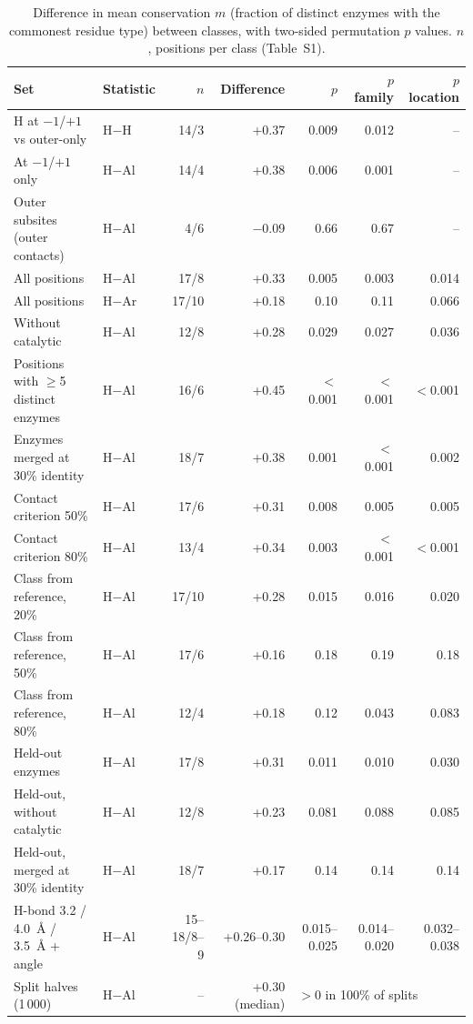 \documentclass[preprint,12pt]{elsarticle}
\begin{document}
\begin{table}[htbp]
\centering\renewcommand{\baselinestretch}{1}\scriptsize\setlength{\tabcolsep}{2pt}
\caption{Difference in mean conservation $m$ (fraction of distinct enzymes with the commonest residue type) between classes, with two-sided permutation $p$ values. $n$, positions per class (Table~S1).}
\label{tab:tests}
\begin{tabular}{p{3.5cm}lrrrrr}
\toprule
Set & Statistic & $n$ & Difference & $p$ & $p$ family & $p$ location\\
\midrule
H at $-1$/$+1$ vs outer-only & H$-$H & 14/3 & +0.37 & 0.009 & 0.012 & --\\
At $-1$/$+1$ only & H$-$Al & 14/4 & +0.38 & 0.006 & 0.001 & --\\
Outer subsites (outer contacts) & H$-$Al & 4/6 & $-$0.09 & 0.66 & 0.67 & --\\
All positions & H$-$Al & 17/8 & +0.33 & 0.005 & 0.003 & 0.014\\
All positions & H$-$Ar & 17/10 & +0.18 & 0.10 & 0.11 & 0.066\\
Without catalytic & H$-$Al & 12/8 & +0.28 & 0.029 & 0.027 & 0.036\\
Positions with $\ge$5 distinct enzymes & H$-$Al & 16/6 & +0.45 & $<$0.001 & $<$0.001 & $<$0.001\\
\addlinespace
Enzymes merged at 30\% identity & H$-$Al & 18/7 & +0.38 & 0.001 & $<$0.001 & 0.002\\
Contact criterion 50\% & H$-$Al & 17/6 & +0.31 & 0.008 & 0.005 & 0.005\\
Contact criterion 80\% & H$-$Al & 13/4 & +0.34 & 0.003 & $<$0.001 & $<$0.001\\
Class from reference, 20\% & H$-$Al & 17/10 & +0.28 & 0.015 & 0.016 & 0.020\\
Class from reference, 50\% & H$-$Al & 17/6 & +0.16 & 0.18 & 0.19 & 0.18\\
Class from reference, 80\% & H$-$Al & 12/4 & +0.18 & 0.12 & 0.043 & 0.083\\
Held-out enzymes & H$-$Al & 17/8 & +0.31 & 0.011 & 0.010 & 0.030\\
Held-out, without catalytic & H$-$Al & 12/8 & +0.23 & 0.081 & 0.088 & 0.085\\
Held-out, merged at 30\% identity & H$-$Al & 18/7 & +0.17 & 0.14 & 0.14 & 0.14\\
H-bond 3.2 / 4.0~\AA{} / 3.5~\AA{} + angle & H$-$Al & 15--18/8--9 & +0.26--0.30 & 0.015--0.025 & 0.014--0.020 & 0.032--0.038\\
Split halves (1\,000) & H$-$Al & -- & +0.30 (median) & \multicolumn{3}{l}{$>$0 in 100\% of splits}\\
\bottomrule
\end{tabular}


\end{table}
\end{document}
